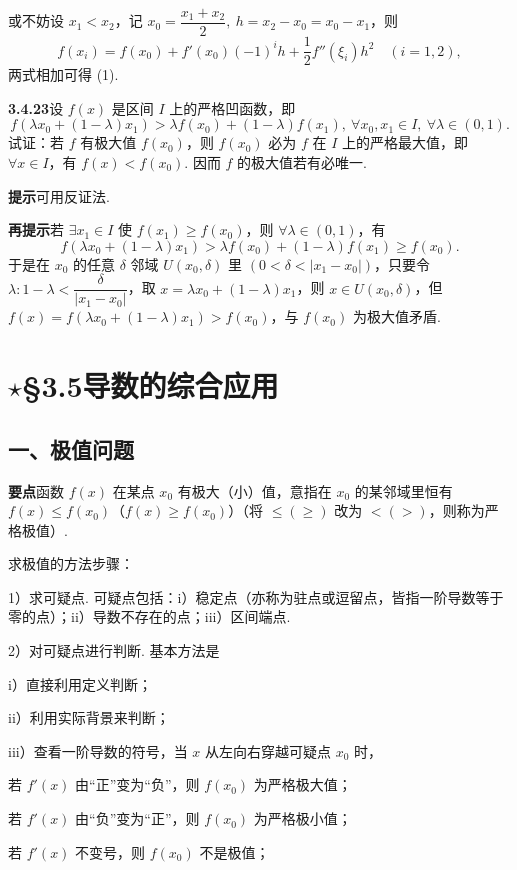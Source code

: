 \documentclass[UTF8, 12pt, fontset=fandol, oneside]{ctexart}
\begin{document}
或不妨设 $x_1<x_2$，记 $x_0=\dfrac{x_1+x_2}2,\ h=x_2-x_0=x_0-x_1$，则
\[
  f(x_i)=f(x_0)+f'(x_0)(-1)^ih+\frac12f''(\xi_i)h^2\quad(i=1,2),
\]
两式相加可得 (1).

\noindent\textbf{3.4.23}\quad 设 $f(x)$ 是区间 $I$ 上的严格凹函数，即
\[
  f(\lambda x_0+(1-\lambda)x_1)>\lambda f(x_0)+(1-\lambda)f(x_1),\ \forall x_0,x_1\in I,\ \forall\lambda\in(0,1).
\]
试证：若 $f$ 有极大值 $f(x_0)$，则 $f(x_0)$ 必为 $f$ 在 $I$ 上的严格最大值，即 $\forall x\in I$，有 $f(x)<f(x_0)$. 因而 $f$ 的极大值若有必唯一.

\noindent\textbf{提示}\quad 可用反证法.

\noindent\textbf{再提示}\quad 若 $\exists x_1\in I$ 使 $f(x_1)\ge f(x_0)$，则 $\forall\lambda\in(0,1)$，有
\[
  f(\lambda x_0+(1-\lambda)x_1)>
  \lambda f(x_0)+(1-\lambda)f(x_1)\ge f(x_0).
\]
于是在 $x_0$ 的任意 $\delta$ 邻域 $U(x_0,\delta)$ 里 $(0<\delta<|x_1-x_0|)$，只要令 $\lambda:1-\lambda<\dfrac{\delta}{|x_1-x_0|}$，取 $x=\lambda x_0+(1-\lambda)x_1$，则 $x\in U(x_0,\delta)$，但 $f(x)=f(\lambda x_0+(1-\lambda)x_1)>f(x_0)$，与 $f(x_0)$ 为极大值矛盾.

\section*{$\star$§3.5\quad 导数的综合应用}

\subsection*{一、极值问题}

\noindent\textbf{要点}\quad 函数 $f(x)$ 在某点 $x_0$ 有极大（小）值，意指在 $x_0$ 的某邻域里恒有 $f(x)\le f(x_0)$（$f(x)\ge f(x_0)$）（将 $\le(\ge)$ 改为 $< (>)$，则称为严格极值）.

求极值的方法步骤：

1）求可疑点. 可疑点包括：i）稳定点（亦称为驻点或逗留点，皆指一阶导数等于零的点）；ii）导数不存在的点；iii）区间端点.

2）对可疑点进行判断. 基本方法是

i）直接利用定义判断；

ii）利用实际背景来判断；

iii）查看一阶导数的符号，当 $x$ 从左向右穿越可疑点 $x_0$ 时，

若 $f'(x)$ 由“正”变为“负”，则 $f(x_0)$ 为严格极大值；

若 $f'(x)$ 由“负”变为“正”，则 $f(x_0)$ 为严格极小值；

若 $f'(x)$ 不变号，则 $f(x_0)$ 不是极值；
\end{document}

